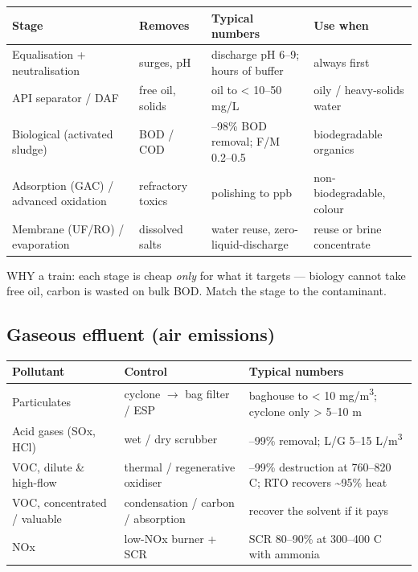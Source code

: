 \documentclass[11pt,a4paper]{article}
\begin{document}
\begin{longtable}[]{@{}>{\raggedright\arraybackslash}p{\dimexpr(\linewidth-8\tabcolsep)/4\relax}>{\raggedright\arraybackslash}p{\dimexpr(\linewidth-8\tabcolsep)/4\relax}>{\raggedright\arraybackslash}p{\dimexpr(\linewidth-8\tabcolsep)/4\relax}>{\raggedright\arraybackslash}p{\dimexpr(\linewidth-8\tabcolsep)/4\relax}@{}}
\toprule\noalign{}
Stage & Removes & Typical numbers & Use when \\
\midrule\noalign{}
\endhead
\bottomrule\noalign{}
\endlastfoot
Equalisation + neutralisation & surges, pH & discharge pH 6--9; hours of
buffer & always first \\
API separator / DAF & free oil, solids & oil to \textless{} 10--50 mg/L
& oily / heavy-solids water \\
Biological (activated sludge) & BOD / COD & 85--98\% BOD removal; F/M
0.2--0.5 & biodegradable organics \\
Adsorption (GAC) / advanced oxidation & refractory toxics & polishing to
ppb & non-biodegradable, colour \\
Membrane (UF/RO) / evaporation & dissolved salts & water reuse,
zero-liquid-discharge & reuse or brine concentrate \\
\end{longtable}

WHY a train: each stage is cheap \emph{only} for what it targets ---
biology cannot take free oil, carbon is wasted on bulk BOD. Match the
stage to the contaminant.

\hypertarget{gaseous-effluent-air-emissions}{%
\subsection{Gaseous effluent (air
emissions)}\label{gaseous-effluent-air-emissions}}

\begin{longtable}[]{@{}>{\raggedright\arraybackslash}p{\dimexpr(\linewidth-6\tabcolsep)/3\relax}>{\raggedright\arraybackslash}p{\dimexpr(\linewidth-6\tabcolsep)/3\relax}>{\raggedright\arraybackslash}p{\dimexpr(\linewidth-6\tabcolsep)/3\relax}@{}}
\toprule\noalign{}
Pollutant & Control & Typical numbers \\
\midrule\noalign{}
\endhead
\bottomrule\noalign{}
\endlastfoot
Particulates & cyclone \(\rightarrow\) bag filter / ESP & baghouse to \textless{} 10
mg/m\textsuperscript{3}; cyclone only \textgreater{} 5--10 \textmu{}m \\
Acid gases (SOx, HCl) & wet / dry scrubber & 90--99\% removal; L/G 5--15
L/m\textsuperscript{3} \\
VOC, dilute \& high-flow & thermal / regenerative oxidiser & 95--99\%
destruction at 760--820 \textdegree{}C; RTO recovers \textasciitilde95\% heat \\
VOC, concentrated / valuable & condensation / carbon / absorption &
recover the solvent if it pays \\
NOx & low-NOx burner + SCR & SCR 80--90\% at 300--400 \textdegree{}C with ammonia \\
\end{longtable}
\end{document}
